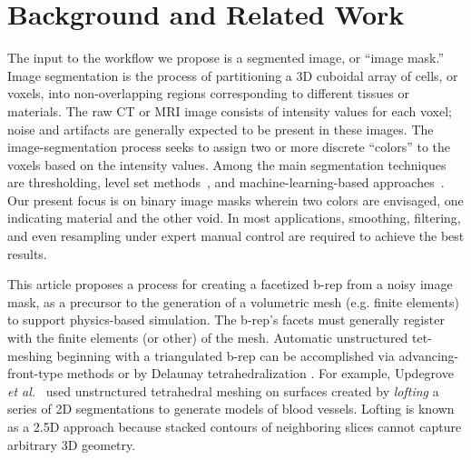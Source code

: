 \section{Background and Related Work}

The input to the workflow we propose is a segmented image, or ``image mask.''
Image segmentation is the process of partitioning a 3D cuboidal array of cells, or voxels, into non-overlapping regions corresponding to different tissues or materials.  The raw CT or MRI image consists of intensity values for each voxel; noise and artifacts are generally expected to be present in these images.  The image-segmentation process seeks to assign two or more discrete ``colors'' to the voxels based on the intensity values.  Among the main segmentation techniques are thresholding, level set methods~\cite{malladi_1995, sethian_1996}, and machine-learning-based approaches~\cite{litjens_2017}.  Our present focus is on binary image masks wherein two colors are envisaged, one indicating material and the other void.  In most applications, smoothing, filtering, and even resampling under expert manual control are required to achieve the best results.

This article proposes a process for creating a facetized b-rep from a noisy image mask, as a precursor to the generation of a volumetric mesh (e.g. finite elements) to support physics-based simulation.  The b-rep's facets must generally register with the finite elements (or other) of the mesh.  Automatic unstructured tet-meshing beginning with a triangulated b-rep can be accomplished via advancing-front-type methods \cite{jin_1993, lohner_1988} or by Delaunay tetrahedralization \cite{lohner_1997}. For example, Updegrove \textit{et al.}~\cite{updegrove_2016} used unstructured tetrahedral meshing on surfaces created by \textit{lofting} a series of 2D segmentations to generate models of blood vessels. Lofting is known as a 2.5D approach because stacked contours of neighboring slices cannot capture arbitrary 3D geometry.


